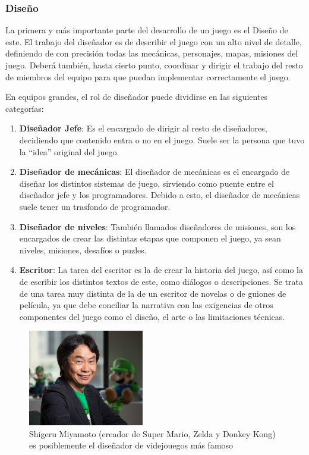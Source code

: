 \subsubsection{Diseño}
La primera y más importante parte del desarrollo de un juego es el Diseño de este. El trabajo del diseñador es de describir el juego con un alto nivel de detalle, definiendo de con precisión todas las mecánicas, personajes, mapas, misiones del juego. Deberá también, hasta cierto punto, coordinar y dirigir el trabajo del resto de miembros del equipo para que puedan implementar correctamente el juego. 

En equipos grandes, el rol de diseñador puede dividirse en las siguientes categorías\cite{development_and_production}:
\begin{enumerate}
\item \textbf{Diseñador Jefe}: Es el encargado de dirigir al resto de diseñadores, decidiendo que contenido entra o no en el juego. Suele ser la persona que tuvo la ``idea'' original del juego.
\item \textbf{Diseñador de mecánicas}: El diseñador de mecánicas es el encargado de diseñar los distintos sistemas de juego, sirviendo como puente entre el diseñador jefe y los programadores. Debido a esto, el diseñador de mecánicas suele tener un trasfondo de programador.
\item \textbf{Diseñador de niveles}: También llamados diseñadores de misiones, son los encargados de crear las distintas etapas que componen el juego, ya sean niveles, misiones, desafíos o puzles.
\item \textbf{Escritor}: La tarea del escritor es la de crear la historia del juego, así como la de escribir los distintos textos de este, como diálogos o descripciones. Se trata de una tarea muy distinta de la de un escritor de novelas o de guiones de película, ya que debe conciliar la narrativa con las exigencias de otros componentes del juego como el diseño, el arte o las limitaciones técnicas.
\end{enumerate}
\begin{figure}[h]
    \centering
    \includegraphics[width=0.45\textwidth]{images/estadodelarte/desarrollo/shigeru-miyamoto}
    \caption{Shigeru Miyamoto (creador de Super Mario, Zelda y Donkey Kong) es posiblemente el diseñador de videjouegos más famoso}
\end{figure}

